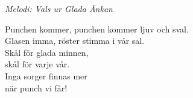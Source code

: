 {\footnotesize\textit{Melodi: Vals ur Glada Änkan}}\par
\vspace{10pt}
Punchen kommer, punchen kommer ljuv och sval.\\
Glasen imma, röster stimma i vår sal.\\
Skål för glada minnen,\\
skål för varje vår.\\
Inga sorger finnas mer\\
när punch vi får!
